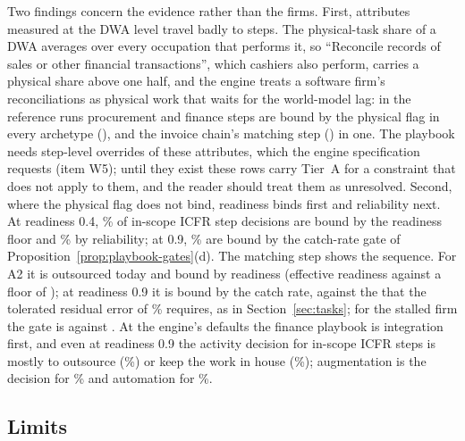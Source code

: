 
Two findings concern the evidence rather than the firms. First, attributes measured at the DWA level travel badly to steps. The physical-task share of a DWA averages over every occupation that performs it, so ``Reconcile records of sales or other financial transactions'', which cashiers also perform, carries a physical share above one half, and the engine treats a software firm's reconciliations as physical work that waits for the world-model lag: in the reference runs \pbStepsPhysicalFinance{} procurement and finance steps are bound by the physical flag in every archetype (\pbStepsPhysicalFinanceList), and the invoice chain's matching step (\pbStepsPhysicalFinanceSome) in one. The playbook needs step-level overrides of these attributes, which the engine specification requests (item W5); until they exist these rows carry Tier~A for a constraint that does not apply to them, and the reader should treat them as unresolved. Second, where the physical flag does not bind, readiness binds first and reliability next. At readiness 0.4, \pbICFRReadShare\% of in-scope ICFR step decisions are bound by the readiness floor and \pbICFRRelShareNow\% by reliability; at 0.9, \pbICFRRelShare\% are bound by the catch-rate gate of Proposition~\ref{prop:playbook-gates}(d). The matching step shows the sequence. For A2 it is outsourced today and bound by readiness (effective readiness \pbInvTwoLowRead{} against a floor of \pbInvTwoLowFloor); at readiness 0.9 it is bound by the catch rate, \pbInvTwoHighDnow{} against the \pbInvTwoHighDstar{} that the tolerated residual error of \pbInvGate\% requires, as in Section~\ref{sec:tasks}; for the stalled firm the gate is \pbInvFiveHighDstar{} against \pbInvFiveHighDnow. At the engine's defaults the finance playbook is integration first, and even at readiness 0.9 the activity decision for in-scope ICFR steps is mostly to outsource (\pbICFROutHigh\%) or keep the work in house (\pbICFRHouseHigh\%); augmentation is the decision for \pbICFRAugHigh\% and automation for \pbICFRAutoHigh\%.

\subsection{Limits}\label{sec:playbook-limits}

